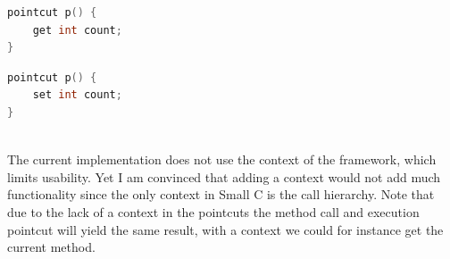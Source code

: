 \documentclass[a4paper]{report}
\begin{document}
\begin{minipage}{0.42\textwidth}
\begin{lstlisting}[language=C, caption=Example of a member get pointcut, label=lst:SmallC_MemberPointcutGet]
pointcut p() {
	get int count;
}
\end{lstlisting}
\end{minipage}\hfill
\begin{minipage}{0.42\textwidth}
\begin{lstlisting}[language=C, caption=Example of a member set pointcut, label=lst:SmallC_MemberPointcutSet]
pointcut p() {
	set int count;
}
\end{lstlisting}
\end{minipage}
\\
The current implementation does not use the context of the framework, which limits usability. Yet I am convinced that adding a context would not add much functionality since the only context in Small C is the call hierarchy. Note that due to the lack of a context in the pointcuts the method call and execution pointcut will yield the same result, with a context we could for instance get the current method.
\end{document}
